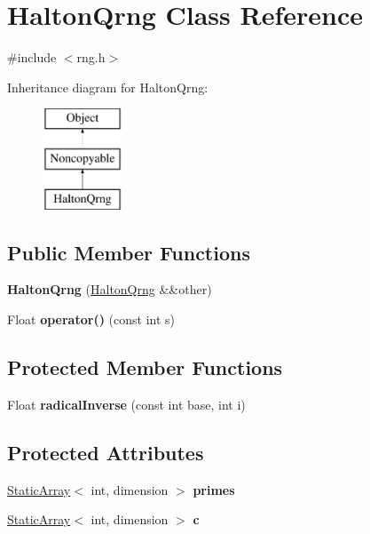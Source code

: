 \hypertarget{classHaltonQrng}{}\section{Halton\+Qrng Class Reference}
\label{classHaltonQrng}


{\ttfamily \#include $<$rng.\+h$>$}

Inheritance diagram for Halton\+Qrng\+:\begin{figure}[H]
\begin{center}
\leavevmode
\includegraphics[height=3.000000cm]{classHaltonQrng}
\end{center}
\end{figure}
\subsection*{Public Member Functions}
\begin{DoxyCompactItemize}
\item 
\hypertarget{classHaltonQrng_a3b006ea9079cecf20883115fc384611e}{}\label{classHaltonQrng_a3b006ea9079cecf20883115fc384611e} 
{\bfseries Halton\+Qrng} (\hyperlink{classHaltonQrng}{Halton\+Qrng} \&\&other)
\item 
\hypertarget{classHaltonQrng_a8b3b37baa7e42890c350dadd9558d02a}{}\label{classHaltonQrng_a8b3b37baa7e42890c350dadd9558d02a} 
Float {\bfseries operator()} (const int s)
\end{DoxyCompactItemize}
\subsection*{Protected Member Functions}
\begin{DoxyCompactItemize}
\item 
\hypertarget{classHaltonQrng_aeb503898a8ea6da28c4c413e25d36b77}{}\label{classHaltonQrng_aeb503898a8ea6da28c4c413e25d36b77} 
Float {\bfseries radical\+Inverse} (const int base, int i)
\end{DoxyCompactItemize}
\subsection*{Protected Attributes}
\begin{DoxyCompactItemize}
\item 
\hypertarget{classHaltonQrng_a25fd783fa496c82588dc47b1bd13a21e}{}\label{classHaltonQrng_a25fd783fa496c82588dc47b1bd13a21e} 
\hyperlink{classStaticArray}{Static\+Array}$<$ int, dimension $>$ {\bfseries primes}
\item 
\hypertarget{classHaltonQrng_a553ba3536d92b86dc6b353ba04c1687f}{}\label{classHaltonQrng_a553ba3536d92b86dc6b353ba04c1687f} 
\hyperlink{classStaticArray}{Static\+Array}$<$ int, dimension $>$ {\bfseries c}
\end{DoxyCompactItemize}
